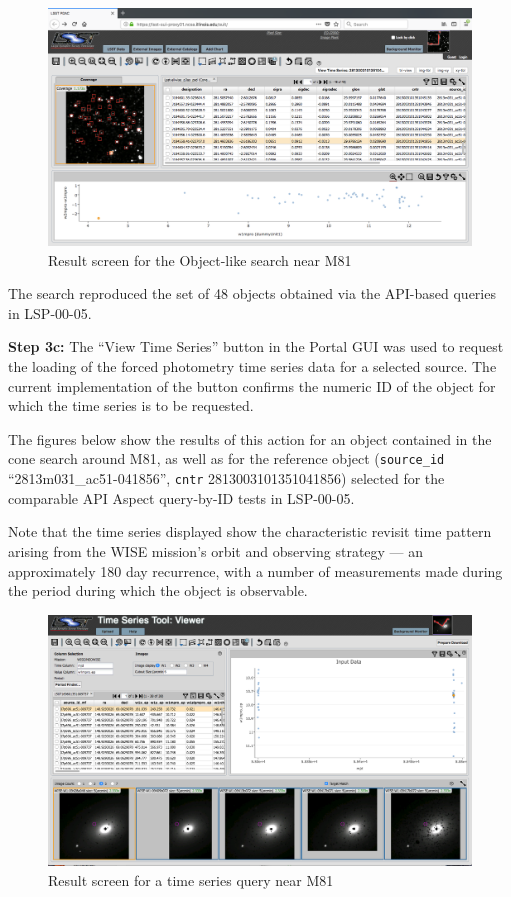 \begin{figure}
  \includegraphics[width=\linewidth]{lsp-00-35/ref05-searchResult.png}
  \caption{Result screen for the Object-like search near M81}
  \label{fig:lsp-00-35-portal-objects-ref05}
\end{figure}

The search reproduced the set of 48 objects obtained via the API-based queries in LSP-00-05.

\textbf{Step 3c:} The ``View Time Series'' button in the Portal GUI was used to request the loading of the forced photometry time series data for a selected source.
The current implementation of the button confirms the numeric ID of the object for which the time series is to be requested.

The figures below show the results of this action for an object contained in the cone search around M81,
as well as for the reference object (\verb|source_id| ``2813m031\_ac51-041856'', \verb|cntr| 2813003101351041856)
selected for the comparable API Aspect query-by-ID tests in LSP-00-05.

Note that the time series displayed show the characteristic revisit time pattern arising from the WISE mission's orbit and observing strategy --- an approximately 180 day recurrence, with a number of measurements made during the period during which the object is observable.

\begin{figure}
  \includegraphics[width=\linewidth]{lsp-00-35/m81-timeSeries.png}
  \caption{Result screen for a time series query near M81}
  \label{fig:lsp-00-35-time-series-m81}
\end{figure}

